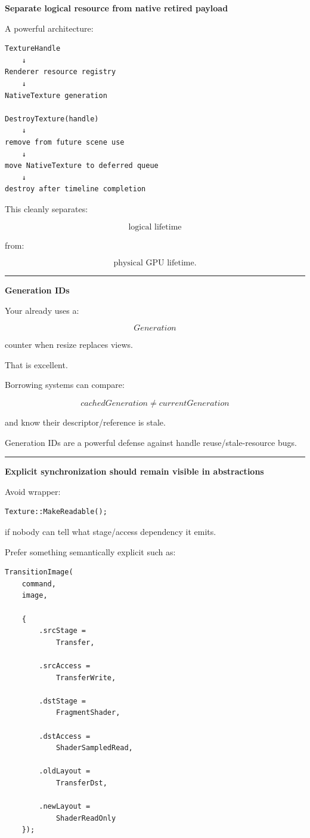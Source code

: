 \textbf{Separate logical resource from native retired payload}

A powerful architecture:

\begin{verbatim}
TextureHandle
    ↓
Renderer resource registry
    ↓
NativeTexture generation

DestroyTexture(handle)
    ↓
remove from future scene use
    ↓
move NativeTexture to deferred queue
    ↓
destroy after timeline completion
\end{verbatim}

This cleanly separates:

\[
\text{logical lifetime}
\]

from:

\[
\text{physical GPU lifetime}.
\]

\begin{center}\rule{0.5\linewidth}{0.5pt}\end{center}

\textbf{Generation IDs}

Your  already uses a:

\[
Generation
\]

counter when resize replaces views.

That is excellent.

Borrowing systems can compare:

\[
cachedGeneration
\neq
currentGeneration
\]

and know their descriptor/reference is stale.

Generation IDs are a powerful defense against handle reuse/stale-resource bugs.

\begin{center}\rule{0.5\linewidth}{0.5pt}\end{center}

\textbf{Explicit synchronization should remain visible in abstractions}

Avoid wrapper:

\begin{verbatim}
Texture::MakeReadable();
\end{verbatim}

if nobody can tell what stage/access dependency it emits.

Prefer something semantically explicit such as:

\begin{verbatim}
TransitionImage(
    command,
    image,

    {
        .srcStage =
            Transfer,

        .srcAccess =
            TransferWrite,

        .dstStage =
            FragmentShader,

        .dstAccess =
            ShaderSampledRead,

        .oldLayout =
            TransferDst,

        .newLayout =
            ShaderReadOnly
    });
\end{verbatim}


